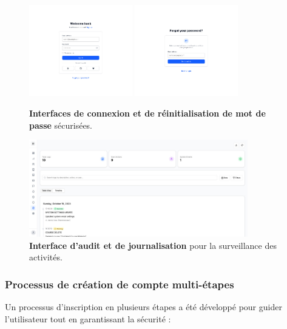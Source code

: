 \begin{figure}[h!]
  \centering
  \includegraphics[width=0.4\textwidth,keepaspectratio]{old-reports/week_4_img/login.jpeg}
  \includegraphics[width=0.4\textwidth,keepaspectratio]{old-reports/week_4_img/reset.jpeg}
  \caption{\textbf{Interfaces de connexion et de réinitialisation de mot de passe} sécurisées.}
  \label{fig:auth_interfaces}
\end{figure}

\begin{figure}[h!]
  \centering
  \includegraphics[width=0.85\textwidth,keepaspectratio]{old-reports/week_4_img/audit.jpeg}
  \caption{\textbf{Interface d'audit et de journalisation} pour la surveillance des activités.}
  \label{fig:audit_logs}
\end{figure}

\subsubsection{Processus de création de compte multi-étapes}

Un processus d'inscription en plusieurs étapes a été développé pour guider l'utilisateur tout en garantissant la sécurité :

